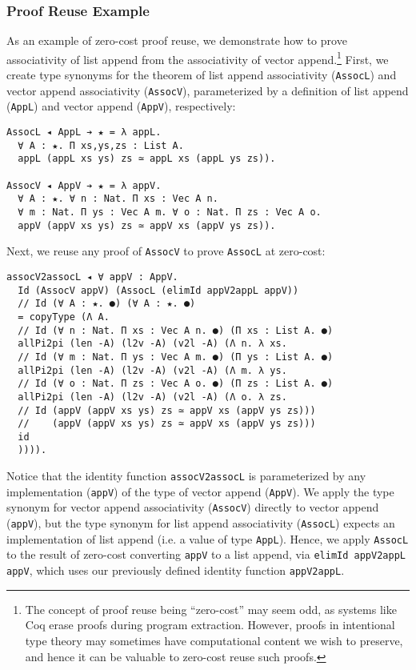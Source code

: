 \documentclass[acmsmall]{acmart}\settopmatter{}
\begin{document}
\subsubsection{Proof Reuse Example}

As an example of zero-cost proof reuse, we demonstrate how to prove
associativity of list append from the associativity of vector
append.\footnote{
  The concept of proof reuse being ``zero-cost'' may seem odd,
  as systems like Coq erase proofs during program
  extraction. However, proofs in intentional type theory may sometimes
  have computational content we wish to preserve,
  and hence it can be valuable to zero-cost reuse such proofs.
}
First, we create type synonyms for the theorem of list append
associativity (\verb;AssocL;) and vector append associativity
(\verb;AssocV;), parameterized by a definition of list append
(\verb;AppL;) and vector append (\verb;AppV;), respectively:

\begin{verbatim}
AssocL ◂ AppL ➔ ★ = λ appL.
  ∀ A : ★. Π xs,ys,zs : List A.  
  appL (appL xs ys) zs ≃ appL xs (appL ys zs)).

AssocV ◂ AppV ➔ ★ = λ appV.
  ∀ A : ★. ∀ n : Nat. Π xs : Vec A n.
  ∀ m : Nat. Π ys : Vec A m. ∀ o : Nat. Π zs : Vec A o.
  appV (appV xs ys) zs ≃ appV xs (appV ys zs)).
\end{verbatim}
Next, we reuse any proof of \verb;AssocV; to prove
\verb;AssocL; at zero-cost:

\begin{verbatim}
assocV2assocL ◂ ∀ appV : AppV.
  Id (AssocV appV) (AssocL (elimId appV2appL appV))
  // Id (∀ A : ★. ●) (∀ A : ★. ●)
  = copyType (Λ A.
  // Id (∀ n : Nat. Π xs : Vec A n. ●) (Π xs : List A. ●)
  allPi2pi (len -A) (l2v -A) (v2l -A) (Λ n. λ xs.
  // Id (∀ m : Nat. Π ys : Vec A m. ●) (Π ys : List A. ●)
  allPi2pi (len -A) (l2v -A) (v2l -A) (Λ m. λ ys.
  // Id (∀ o : Nat. Π zs : Vec A o. ●) (Π zs : List A. ●)
  allPi2pi (len -A) (l2v -A) (v2l -A) (Λ o. λ zs.
  // Id (appV (appV xs ys) zs ≃ appV xs (appV ys zs)))
  //    (appV (appV xs ys) zs ≃ appV xs (appV ys zs)))
  id
  )))).
\end{verbatim}
Notice that the identity function \verb;assocV2assocL; is parameterized
by any implementation (\verb;appV;) of the type of vector append
(\verb;AppV;). We apply the type synonym for vector append associativity
(\verb;AssocV;) directly to vector append (\verb;appV;), but the type
synonym for list append associativity (\verb;AssocL;) expects an
implementation of list append (i.e. a value of type
\verb;AppL;). Hence, we apply \verb;AssocL; to the result of
zero-cost converting \verb;appV; to a list append, via
\verb;elimId appV2appL appV;, which uses our
previously defined identity function \verb;appV2appL;.
\end{document}

